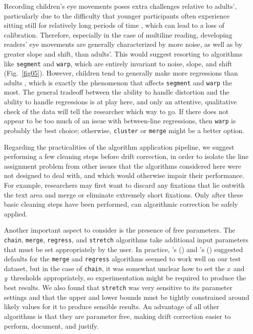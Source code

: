 \documentclass[doc,biblatex]{apa7}
\newcommand\possessivecite[1]{\citeauthor{#1}'s (\citeyear{#1})} %
\begin{document}
Recording children's eye movements poses extra challenges relative to adults', particularly due to the difficulty that younger participants often experience sitting still for relatively long periods of time \parencite{BlytheJoseph:2011}, which can lead to a loss of calibration. Therefore, especially in the case of multiline reading, developing readers' eye movements are generally characterized by more noise, as well as by greater slope and shift, than adults'. This would suggest resorting to algorithms like \texttt{segment} and \texttt{warp}, which are entirely invariant to noise, slope, and shift (Fig.~\ref{fig05}). However, children tend to generally make more regressions than adults \parencite[e.g.,][]{Reichle:2003, BlytheJoseph:2011}, which is exactly the phenomenon that affects \texttt{segment} and \texttt{warp} the most. The general tradeoff between the ability to handle distortion and the ability to handle regressions is at play here, and only an attentive, qualitative check of the data will tell the researcher which way to go. If there does not appear to be too much of an issue with between-line regressions, then \texttt{warp} is probably the best choice; otherwise, \texttt{cluster} or \texttt{merge} might be a better option.

Regarding the practicalities of the algorithm application pipeline, we suggest performing a few cleaning steps before drift correction, in order to isolate the line assignment problem from other issues that the algorithms considered here were not designed to deal with, and which would otherwise impair their performance. For example, researchers may first want to discard any fixations that lie outwith the text area and merge or eliminate extremely short fixations. Only after these basic cleaning steps have been performed, can algorithmic correction be safely applied.

Another important aspect to consider is the presence of free parameters. The \texttt{chain}, \texttt{merge}, \texttt{regress}, and \texttt{stretch} algorithms take additional input parameters that must be set appropriately by the user. In practice, \possessivecite{Spakov:2019} and \possessivecite{Cohen:2013} suggested defaults for the \texttt{merge} and \texttt{regress} algorithms seemed to work well on our test dataset, but in the case of \texttt{chain}, it was somewhat unclear how to set the \textit{x}~and \textit{y}~thresholds appropriately, so experimentation might be required to produce the best results. We also found that \texttt{stretch} was very sensitive to its parameter settings and that the upper and lower bounds must be tightly constrained around likely values for it to produce sensible results. An advantage of all other algorithms is that they are parameter free, making drift correction easier to perform, document, and justify.
\end{document}

